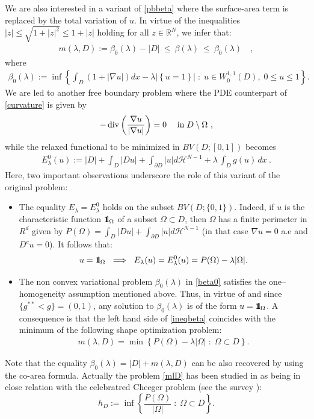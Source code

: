 \documentclass[reqno,11pt]{amsart}
\theoremstyle{definition}
\numberwithin{equation}{section}
\DeclareMathOperator{\Div}{div}
\newcommand{\HH}{\mathcal{H}}
\newcommand{\RR}{\mathbb{R}}
\newcommand{\tinm}[1]{\text{\;#1\;}}
\newcommand{\1}{{{\bf 1}\kern-0,28em\rm l}}
\newcommand{\one}{{{\bf 1}\kern-0,28em\rm l}}
\def\sepa{\; : \;}
\newcommand{\aco}[1]{\left\{#1\right\}}
\newcommand{\pare}[1]{\left(#1\right)}
\def\O{\Omega}
\def\l{\lambda}
\begin{document}
We are also interested  in  a variant of \eqref{pbbeta} where
 the surface-area term is replaced by the total variation of $u$. In virtue of the inequalities $|z| \le \sqrt{1+|z|^2} \le 1+|z|$ holding for all $z\in\RR^N$, we  infer that:
 \begin{align}\label{ineqbeta}
m(\lambda,D) := \beta_0(\lambda) -|D|\ \le\ \beta(\lambda)\ \le\ \beta_0(\lambda)\quad ,
\end{align}
where
  \begin{align}
\beta_0(\lambda):=\inf \left\{ \int_D (1+|\nabla u|)dx -  \lambda|\aco{u= 1}| \; : \; u\in W^{1,1}_0(D), \; 0\le u \le 1 \right\}. \label{beta0}
\end{align}
We are led to another free boundary problem where the PDE counterpart of \eqref{curvature} is given by
\begin{gather*}
-\Div \pare{ \frac{\nabla u}{|\nabla u|}  }= 0 \quad \tinm{in} D\setminus \Omega\ ,\end{gather*}
while the relaxed functional to be minimized in $BV(D;[0,1])$ becomes
\begin{align}
E_\lambda^0(u) := |D|+ \int_D |D u| +  \int_{\partial D} |u|d\HH^{N-1} + \lambda\, \int_D g(u)\, dx\ .\label{E0l}
\end{align}
Here, two important observations underscore the role of this variant of the original problem: 
\begin{itemize}[leftmargin=6mm]
\item  The equality $E_\lambda=E_\lambda^0$ holds on the subset $BV(D; \{0,1\})$. Indeed, if $u$ is the characteristic function $\one_\Omega$ of a subset $\Omega\subset D$, then $\Omega$ has a finite perimeter in $R^d$ given by  $P(\Omega)=  \int_D |D u| +  \int_{\partial D} |u|d\HH^{N-1}$ (in that case $\nabla u=0$ a.e and $D^c u=0$). It follows that: 
\begin{equation}\label{E=E_0}
 u=\one_\Omega \ \implies\ E_\lambda(u)=E_\lambda^0(u)= P(\O)-\lambda |\Omega|.
\end{equation}


\item The non convex variational problem $\beta_0(\lambda)$ in \eqref{beta0} satisfies the  one--homogeneity assumption mentioned above. Thus, in virtue of \cite[Theorem 2.2]{bouphan2025} and since $\{g^{**}<g\}=(0,1)$, any solution to $\beta_0(\lambda)$ is of the form $u=\one_\Omega$. A consequence is that  the left hand side of \eqref{ineqbeta} coincides with the minimum of the following shape optimization problem:
\begin{align}
m(\lambda,D)= \min\aco{P(\Omega) -\lambda |\Omega| \sepa \Omega\subset D}. \label{mlD}
\end{align}
\end{itemize}
Note that the equality $\beta_0(\l)= |D| + m(\l,D)$ can be also recovered by using the co-area formula. Actually  the problem \eqref{mlD}  has been studied in \cite{ alter2009uniqueness,alter2005characterization} as being in  close relation with the celebratred Cheeger problem (see the survey \cite{ parini2011introduction}): 
\begin{equation}\label{def:h_D}
 h_D := \inf\aco{\frac{P(\Omega)}{|\Omega|} \sepa \Omega\subset D} .
\end{equation}
\end{document}
